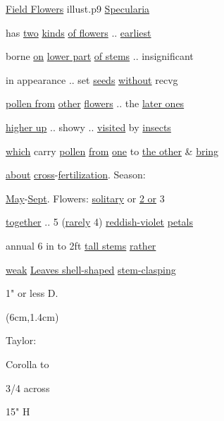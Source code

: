 \documentclass[a4paper]{article}
\begin{document}
\begin{minipage}[t]{10cm}
\vspace{3cm}
\ul{Field Flowers}
illust.p9 \ul{Specularia}\par
{}%
\hspace{3cm}\par 
\setul{}{2pt}
has \ul{two} \ul{kinds} \ul{of flowers} .. \ul{earliest}\par
borne \ul{on} \ul{lower part} \ul{of stems} .. insignificant\par
in appearance .. set \ul{seeds} \ul{without} recvg\par
\ul{pollen from} \ul{other} \ul{flowers} .. the \ul{later ones}\par
\ul{higher up} .. showy .. \ul{visited} by \ul{insects}\par
\ul{which} carry \ul{pollen} \ul{from} \ul{one} to \ul{the other} \& \ul{bring}\par
\ul{about} \ul{cross}-\ul{fertilization}. Season:\par
\ul{May}-\ul{Sept}. Flowers: \ul{solitary} or \ul{2 or} 3\par
\ul{together} .. 5 (\ul{rarely} 4) \ul{reddish-violet} \ul{petals}\par
annual 6 in to 2ft \ul{tall stems} \ul{rather}\par
\ul{weak} \ul{Leaves shell-shaped} \ul{stem}\ul{-clasping}\par
1" or less D.\par 
\end{minipage}


\begin{textblock*}{2cm}(6cm,1.4cm)%
	\begin{minipage}{2cm} 
        \color{blue}
        Taylor:\par
        \vspace{5pt}
        \small
            Corolla to\par
            3/4 across\par
            15" H\par
        \normalfont			
	\end{minipage}%
\end{textblock*}%
\end{document}
